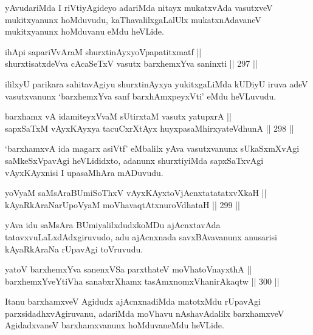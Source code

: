 \begin{artha}
yAvudariMda I riVtiyAgideyo adariMda nitayx mukatxvAda vasutxveV
mukitxyanunx hoMduvudu, kaThavalilxgaLalUlx mukatxnAdavaneV mukitxyanunx hoMduvanu eMdu heVLide.
\end{artha}

\begin{shl}
ihApi sapariVvAraM shurxtinAyxyoVpapatitxmatf || \\
shurxtisatxdeVva cA\s \s caSeTxV vasutx barxhemxYva saninxti \hfill || 297 ||  
\end{shl}

\begin{artha}
ililxyU parikara sahitavAgiyu shurxtinAyxya yukitxgaLiMda kUDiyU iruva
adeV vasutxvanunx `barxhemxYva sanf barxhAmxpeyxVti' eMdu heVLuvudu.
\end{artha}

\begin{shl}
barxhamx vA idamiteyxVvaM sUtirxtaM vasutx yatupxrA || \\
sapxSaTxM vAyxKAyxya tacuCxrXtAyx huyxpasaMhirxyateV\s dhunA \hfill || 298 ||  
\end{shl}

\begin{artha}
`barxhamxvA ida magarx asiVtf' eMbalilx yAva vasutxvanunx sUkaSxmXvAgi
saMkeSxVpavAgi heVLididxto, adanunx shurxtiyiMda sapxSaTxvAgi
vAyxKAyxnisi I upasaMhAra mADuvudu.
\end{artha}


\begin{shl}
yoV\s yaM saMsAraBUmiSoThxV vAyxKAyxtoV\s jAcnxtatatatxvXkaH || \\
kAyaRkAraNarUpoV\s yaM moVhavaqtAtxnuroVdhataH \hfill || 299 ||  
\end{shl}

\begin{artha}
yAva idu saMsAra BUmiyalilxdudxkoMDu ajAcnxtavAda
tatavxvuLaLxdAdxgiruvudo, adu ajAcnxnada savxBAvavanunx anusarisi
kAyaRkAraNa rUpavAgi toVruvudu.
\end{artha}

\begin{shl}
yatoV barxhemxYva sanenxVSa parxthateV moVhatoV\s nayxthA || \\
barxhemxYveYtiVha sanabxrXhamx tasAmxnomxVhanirAkaqtw \hfill || 300 ||  
\end{shl}

\begin{artha}
Itanu barxhamxveV Agidudx ajAcnxnadiMda matotxMdu rUpavAgi
parxsidadhxvAgiruvanu, adariMda moVhavu nAshavAdalilx barxhamxveV
AgidadxvaneV barxhamxvanunx hoMduvaneMdu heVLide.
\end{artha}

